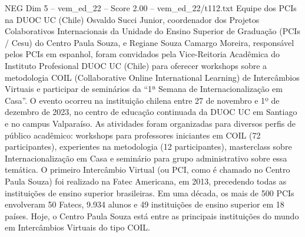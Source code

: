 \begin{textsample}{NEG Dim 5 – vem\_ed\_22 – Score 2.00 – vem\_ed\_22/t112.txt}  \label{ex:f5_neg_084}
Equipe dos PCIs na DUOC UC (Chile) Osvaldo Succi Junior, coordenador dos Projetos Colaborativos Internacionais da Unidade do Ensino Superior de Graduação (PCIs / Cesu) do Centro Paula Souza, e Regiane Souza Camargo Moreira, responsável pelos PCIs em espanhol, foram convidados pela Vice-Reitoria Acadêmica do Instituto Profesional DUOC UC (Chile) para oferecer workshops sobre a metodologia COIL (Collaborative Online International Learning) de Intercâmbios Virtuais e participar de seminários da “1ª Semana de Internacionalização em Casa”.
O evento ocorreu na instituição chilena entre 27 de novembro e 1º de dezembro de 2023, no centro de educação continuada da DUOC UC em Santiago e no campus Valparaíso.
As atividades foram organizadas para diversos perfis de público acadêmico: workshops para professores iniciantes em COIL (72 participantes), experientes na metodologia (12 participantes), masterclass sobre Internacionalização em Casa e seminário para grupo administrativo sobre essa temática.
O primeiro Intercâmbio Virtual (ou PCI, como é chamado no Centro Paula Souza) foi realizado na Fatec Americana, em 2013, precedendo todas as instituições de ensino superior brasileiras.
Em uma década, os mais de 500 PCIs envolveram 50 Fatecs, 9.934 alunos e 49 instituições de ensino superior em 18 países.
Hoje, o Centro Paula Souza está entre as principais instituições do mundo em Intercâmbios Virtuais do tipo COIL.

\end{textsample}
